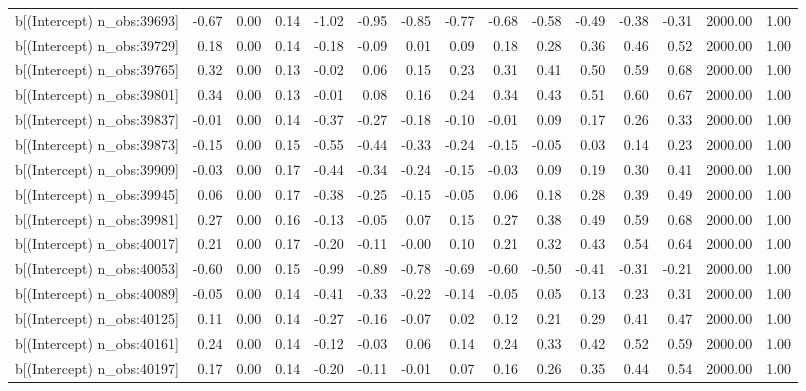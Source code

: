 \begin{table}[ht]
\begin{tabular}{rrrrrrrrrrrrrrr}
  b[(Intercept) n\_obs:39693] & -0.67 & 0.00 & 0.14 & -1.02 & -0.95 & -0.85 & -0.77 & -0.68 & -0.58 & -0.49 & -0.38 & -0.31 & 2000.00 & 1.00 \\ 
  b[(Intercept) n\_obs:39729] & 0.18 & 0.00 & 0.14 & -0.18 & -0.09 & 0.01 & 0.09 & 0.18 & 0.28 & 0.36 & 0.46 & 0.52 & 2000.00 & 1.00 \\ 
  b[(Intercept) n\_obs:39765] & 0.32 & 0.00 & 0.13 & -0.02 & 0.06 & 0.15 & 0.23 & 0.31 & 0.41 & 0.50 & 0.59 & 0.68 & 2000.00 & 1.00 \\ 
  b[(Intercept) n\_obs:39801] & 0.34 & 0.00 & 0.13 & -0.01 & 0.08 & 0.16 & 0.24 & 0.34 & 0.43 & 0.51 & 0.60 & 0.67 & 2000.00 & 1.00 \\ 
  b[(Intercept) n\_obs:39837] & -0.01 & 0.00 & 0.14 & -0.37 & -0.27 & -0.18 & -0.10 & -0.01 & 0.09 & 0.17 & 0.26 & 0.33 & 2000.00 & 1.00 \\ 
  b[(Intercept) n\_obs:39873] & -0.15 & 0.00 & 0.15 & -0.55 & -0.44 & -0.33 & -0.24 & -0.15 & -0.05 & 0.03 & 0.14 & 0.23 & 2000.00 & 1.00 \\ 
  b[(Intercept) n\_obs:39909] & -0.03 & 0.00 & 0.17 & -0.44 & -0.34 & -0.24 & -0.15 & -0.03 & 0.09 & 0.19 & 0.30 & 0.41 & 2000.00 & 1.00 \\ 
  b[(Intercept) n\_obs:39945] & 0.06 & 0.00 & 0.17 & -0.38 & -0.25 & -0.15 & -0.05 & 0.06 & 0.18 & 0.28 & 0.39 & 0.49 & 2000.00 & 1.00 \\ 
  b[(Intercept) n\_obs:39981] & 0.27 & 0.00 & 0.16 & -0.13 & -0.05 & 0.07 & 0.15 & 0.27 & 0.38 & 0.49 & 0.59 & 0.68 & 2000.00 & 1.00 \\ 
  b[(Intercept) n\_obs:40017] & 0.21 & 0.00 & 0.17 & -0.20 & -0.11 & -0.00 & 0.10 & 0.21 & 0.32 & 0.43 & 0.54 & 0.64 & 2000.00 & 1.00 \\ 
  b[(Intercept) n\_obs:40053] & -0.60 & 0.00 & 0.15 & -0.99 & -0.89 & -0.78 & -0.69 & -0.60 & -0.50 & -0.41 & -0.31 & -0.21 & 2000.00 & 1.00 \\ 
  b[(Intercept) n\_obs:40089] & -0.05 & 0.00 & 0.14 & -0.41 & -0.33 & -0.22 & -0.14 & -0.05 & 0.05 & 0.13 & 0.23 & 0.31 & 2000.00 & 1.00 \\ 
  b[(Intercept) n\_obs:40125] & 0.11 & 0.00 & 0.14 & -0.27 & -0.16 & -0.07 & 0.02 & 0.12 & 0.21 & 0.29 & 0.41 & 0.47 & 2000.00 & 1.00 \\ 
  b[(Intercept) n\_obs:40161] & 0.24 & 0.00 & 0.14 & -0.12 & -0.03 & 0.06 & 0.14 & 0.24 & 0.33 & 0.42 & 0.52 & 0.59 & 2000.00 & 1.00 \\ 
  b[(Intercept) n\_obs:40197] & 0.17 & 0.00 & 0.14 & -0.20 & -0.11 & -0.01 & 0.07 & 0.16 & 0.26 & 0.35 & 0.44 & 0.54 & 2000.00 & 1.00 \\ 

\end{tabular}
\end{table}
